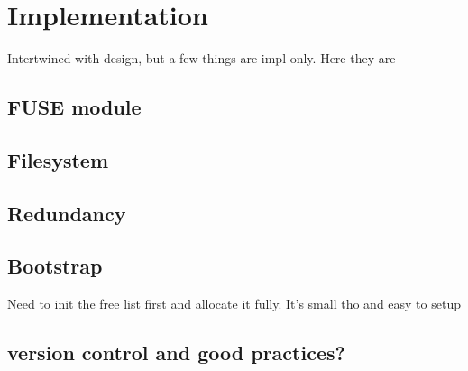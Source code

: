\chapter{Implementation}

    Intertwined with design, but a few things are impl only. Here they are

    \section{FUSE module}

    \section{Filesystem}

    \section{Redundancy}

    \section{Bootstrap}

        Need to init the free list first and allocate it fully. It's small tho and easy to setup

    \section{version control and good practices?}

